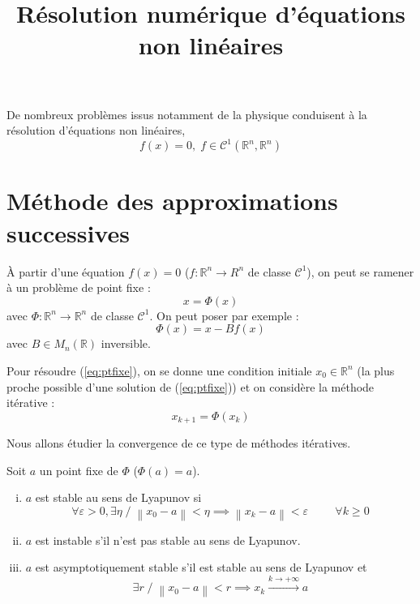 \documentclass[a4paper,11pt]{article}
\title{\huge \bfseries Résolution numérique d'équations non linéaires}
\date{}
\newcommand{\R}{\mathbb{R}}
\newcommand{\norm}[1]{\left\lVert#1\right\rVert}
\theoremstyle{plain} %
\begin{document}
\maketitle

De nombreux problèmes issus notamment de la physique conduisent à la résolution d'équations non linéaires,
\[
    f(x)=0, \; f \in \mathcal{C}^1(\R^n,\R^n)
\]

\section{Méthode des approximations successives}

À partir d'une équation $f(x) = 0$ ($f : \R^n \longrightarrow R^n$ de classe $\mathcal{C}^1$),
on peut se ramener à un problème de point fixe :
\begin{equation}
    x = \Phi(x)
    \label{eq:ptfixe}
\end{equation}
avec $\Phi : \R^n \longrightarrow \R^n$ de classe $\mathcal{C}^1$. On peut poser par exemple :
\begin{equation*}
    \Phi(x) = x - B f(x)
\end{equation*}
avec $B \in M_n(\R)$ inversible.

Pour résoudre (\ref{eq:ptfixe}), on se donne une condition initiale $x_0 \in \R^n$ (la plus proche possible d'une solution de (\ref{eq:ptfixe})) et on considère la méthode itérative :
\begin{equation}
    x_{k+1} = \Phi(x_k)
    \label{eq:methodeiterative}
\end{equation}

Nous allons étudier la convergence de ce type de méthodes itératives.

\begin{fdef}
    Soit $a$ un point fixe de $\Phi$ ($\Phi(a) = a$).
    \begin{enumerate}[i)]
        \item $a$ est stable au sens de Lyapunov si
            \[
                \forall \varepsilon > 0, \exists \eta \; / \; \norm{x_0 - a} < \eta \implies \norm{x_k - a} < \varepsilon \hspace{1cm} \forall k \geq 0
            \]

        \item $a$ est instable s'il n'est pas stable au sens de Lyapunov.

        \item $a$ est asymptotiquement stable s'il est stable au sens de Lyapunov et
            \[
                \exists r \; / \; \norm{x_0 - a} < r \implies x_k \xrightarrow{k \to +\infty} a
            \]
    \end{enumerate}
\end{fdef}
\end{document}
